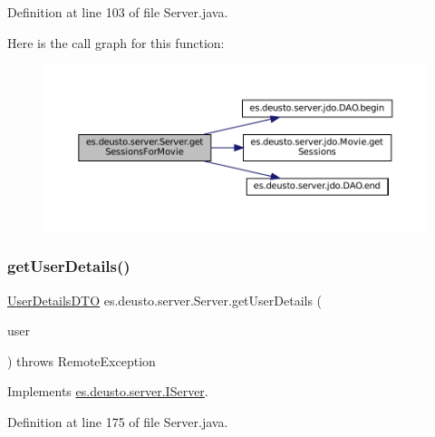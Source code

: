 Definition at line 103 of file Server.\+java.

Here is the call graph for this function\+:
\nopagebreak
\begin{figure}[H]
\begin{center}
\leavevmode
\includegraphics[width=350pt]{classes_1_1deusto_1_1server_1_1_server_a33a6671bb4dc4bd9e23df10e53e5632d_cgraph}
\end{center}
\end{figure}
\mbox{\label{classes_1_1deusto_1_1server_1_1_server_ad742fe9a45edccd8b2309be98a74baae}} 
\subsubsection{\texorpdfstring{getUserDetails()}{getUserDetails()}}
{\footnotesize\ttfamily \mbox{\hyperlink{classes_1_1deusto_1_1server_1_1data_1_1_user_details_d_t_o}{User\+Details\+D\+TO}} es.\+deusto.\+server.\+Server.\+get\+User\+Details (\begin{DoxyParamCaption}\item[{\mbox{\hyperlink{classes_1_1deusto_1_1server_1_1data_1_1_user_d_t_o}{User\+D\+TO}}}]{user }\end{DoxyParamCaption}) throws Remote\+Exception}



Implements \mbox{\hyperlink{interfacees_1_1deusto_1_1server_1_1_i_server_a2dcd7f0b0e157eb797e20432c0b0e971}{es.\+deusto.\+server.\+I\+Server}}.



Definition at line 175 of file Server.\+java.

